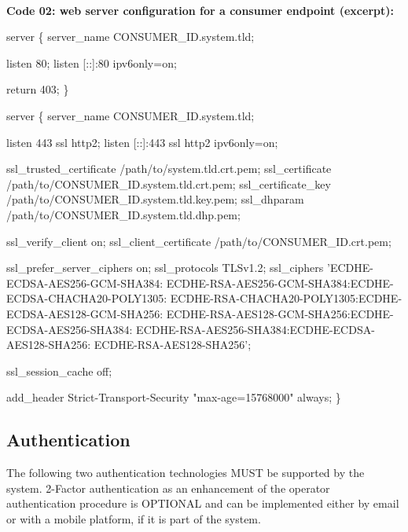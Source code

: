 \documentclass[12pt,english,a4paper,titlepage,cleardoublepage=empty,dottedtoc]{report}
\newenvironment{Shaded}{\begin{snugshade}}{\end{snugshade}}
\newcommand{\NormalTok}[1]{#1}
\begin{document}
~~

\textbf{\protect\hypertarget{spec_code-01_nginx-config-consumer-endpoint}{}{Code
02: web server configuration for a consumer endpoint (excerpt)}:}

\begin{Shaded}
\begin{Highlighting}[numbers=left,,]
\NormalTok{server \{}
\NormalTok{    server_name CONSUMER_ID.system.tld;}
    
\NormalTok{    listen 80;}
\NormalTok{    listen [::]:80 ipv6only=on;}
    
\NormalTok{    return 403;}
\NormalTok{\}}

\NormalTok{server \{}
\NormalTok{    server_name CONSUMER_ID.system.tld;}
    
\NormalTok{    listen 443 ssl http2;}
\NormalTok{    listen [::]:443 ssl http2 ipv6only=on;}
    
\NormalTok{    ssl_trusted_certificate /path/to/system.tld.crt.pem;}
\NormalTok{    ssl_certificate         /path/to/CONSUMER_ID.system.tld.crt.pem;}
\NormalTok{    ssl_certificate_key     /path/to/CONSUMER_ID.system.tld.key.pem;}
\NormalTok{    ssl_dhparam             /path/to/CONSUMER_ID.system.tld.dhp.pem;}
    
\NormalTok{    ssl_verify_client on;}
\NormalTok{    ssl_client_certificate  /path/to/CONSUMER_ID.crt.pem;}
    
\NormalTok{    ssl_prefer_server_ciphers on;}
\NormalTok{    ssl_protocols TLSv1.2;}
\NormalTok{    ssl_ciphers 'ECDHE-ECDSA-AES256-GCM-SHA384:}
\NormalTok{        ECDHE-RSA-AES256-GCM-SHA384:ECDHE-ECDSA-CHACHA20-POLY1305:}
\NormalTok{        ECDHE-RSA-CHACHA20-POLY1305:ECDHE-ECDSA-AES128-GCM-SHA256:}
\NormalTok{        ECDHE-RSA-AES128-GCM-SHA256:ECDHE-ECDSA-AES256-SHA384:}
\NormalTok{        ECDHE-RSA-AES256-SHA384:ECDHE-ECDSA-AES128-SHA256:}
\NormalTok{        ECDHE-RSA-AES128-SHA256';}
    
\NormalTok{    ssl_session_cache off;}
    
\NormalTok{    add_header Strict-Transport-Security "max-age=15768000" always;}
\NormalTok{\}}
\end{Highlighting}
\end{Shaded}

\subsection{Authentication}\label{authentication-1}

The following two authentication technologies MUST be supported by the
system. 2-Factor authentication as an enhancement of the operator
authentication procedure is OPTIONAL and can be implemented either by
email or with a mobile platform, if it is part of the system.
\end{document}
